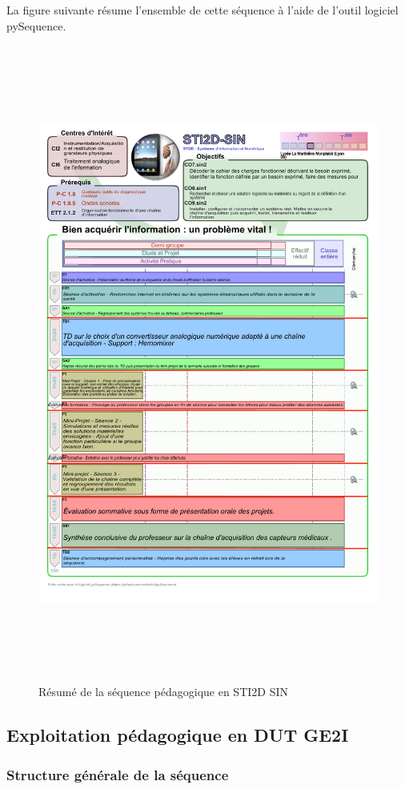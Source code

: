 \documentclass[12pt]{article}
\begin{document}
La figure suivante résume l'ensemble de cette séquence à l'aide de l'outil logiciel pySequence.

\begin{figure}[!h]
\centering
\includegraphics[width=18cm,height=21cm,trim=0cm 0cm 0cm 0cm, clip=true]{Images_Rapport/pysequence}
\caption{Résumé de la séquence pédagogique en STI2D SIN}
\end{figure}


\newpage  
\subsection{Exploitation pédagogique en DUT GE2I}

\subsubsection{Structure générale de la séquence}
\end{document}
